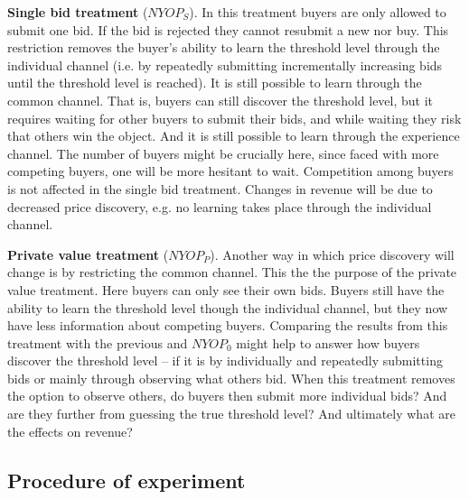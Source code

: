 \documentclass[a4paper,12pt]{article}
\begin{document}
	{\bf Single bid treatment} ($NYOP_S$).
	In this treatment buyers are only allowed to submit one bid. If the bid is rejected they cannot resubmit a new nor buy. This restriction removes the buyer's ability to learn the threshold level through the individual channel (i.e. by repeatedly submitting incrementally increasing bids until the threshold level is reached). It is still possible to learn through the common channel. That is, buyers can still discover the threshold level, but it requires waiting for other buyers to submit their bids, and while waiting they risk that others win the object. And it is still possible to learn through the experience channel. The number of buyers might be crucially here, since faced with more competing buyers, one will be more hesitant to wait. Competition among buyers is not affected in the single bid treatment. Changes in revenue will be due to decreased price discovery, e.g. no learning takes place through the individual channel.

	{\bf Private value treatment} ($NYOP_P$).
	Another way in which price discovery will change is by restricting the common channel. This the the purpose of the private value treatment. Here buyers can only see their own bids. Buyers still have the ability to learn the threshold level though the individual channel, but they now have less information about competing buyers. Comparing the results from this treatment with the previous and $NYOP_0$ might help to answer how buyers discover the threshold level -- if it is by individually and repeatedly submitting bids or mainly through observing what others bid. When this treatment removes the option to observe others, do buyers then submit more individual bids? And are they further from guessing the true threshold level? And ultimately what are the effects on revenue? 
	
	\subsection{Procedure of experiment}
	
\end{document}
